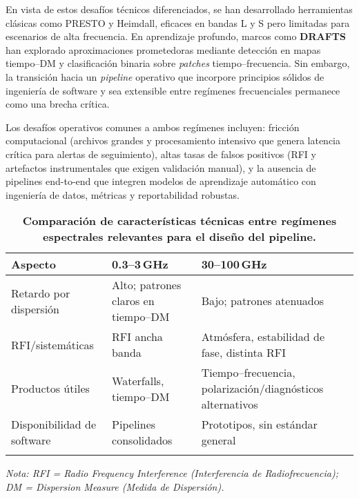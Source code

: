 \medskip

En vista de estos desafíos técnicos diferenciados, se han desarrollado herramientas clásicas como PRESTO y Heimdall, eficaces en bandas L y S pero limitadas para escenarios de alta frecuencia. En aprendizaje profundo, marcos como \textbf{DRAFTS} han explorado aproximaciones prometedoras mediante detección en mapas tiempo--DM y clasificación binaria sobre \emph{patches} tiempo--frecuencia. Sin embargo, la transición hacia un \textit{pipeline} operativo que incorpore principios sólidos de ingeniería de software y sea extensible entre regímenes frecuenciales permanece como una brecha crítica.

Los desafíos operativos comunes a ambos regímenes incluyen: fricción computacional (archivos grandes y procesamiento intensivo que genera latencia crítica para alertas de seguimiento), altas tasas de falsos positivos (RFI y artefactos instrumentales que exigen validación manual), y la ausencia de pipelines end-to-end que integren modelos de aprendizaje automático con ingeniería de datos, métricas y reportabilidad robustas.

\begin{table}[h]
\centering
\caption{\textbf{Comparación de características técnicas entre regímenes espectrales relevantes para el diseño del pipeline.}}
\vspace{0.5em}
\begin{tabular}{|l|l|l|}
\toprule
\textbf{Aspecto} & \textbf{0.3--3\,GHz} & \textbf{30--100\,GHz} \\
\midrule
Retardo por dispersión & Alto; patrones claros en tiempo--DM & Bajo; patrones atenuados \\
RFI/sistemáticas & RFI ancha banda & Atmósfera, estabilidad de fase, distinta RFI \\
Productos útiles & Waterfalls, tiempo--DM & Tiempo--frecuencia, polarización/diagnósticos alternativos \\
Disponibilidad de software & Pipelines consolidados & Prototipos, sin estándar general \\
\bottomrule
\vspace{0.2em}
\end{tabular}
\raggedright
\small{\textit{Nota: RFI = Radio Frequency Interference (Interferencia de Radiofrecuencia); DM = Dispersion Measure (Medida de Dispersión).}}
\end{table}

\medskip



